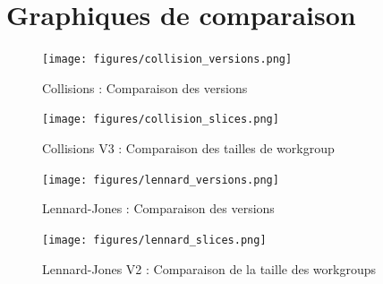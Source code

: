 \documentclass{article}
\begin{document}
\section{Graphiques de comparaison}
\begin{figure}[!ht]
	\caption{Collisions : Comparaison des versions}
	\label{collisions-versions}
	\texttt{[image: figures/collision\_versions.png]}
\end{figure}
\begin{figure}[!ht]
	\caption{Collisions V3 : Comparaison des tailles de workgroup}
	\label{collisions-slices}
	\texttt{[image: figures/collision\_slices.png]}
\end{figure}
\begin{figure}[!ht]
	\caption{Lennard-Jones : Comparaison des versions}
	\label{lennard-versions}
	\texttt{[image: figures/lennard\_versions.png]}
\end{figure}
\begin{figure}[!ht]
	\caption{Lennard-Jones V2 : Comparaison de la taille des workgroups}
	\label{lennard-slices}
	\texttt{[image: figures/lennard\_slices.png]}
\end{figure}
\end{document}
